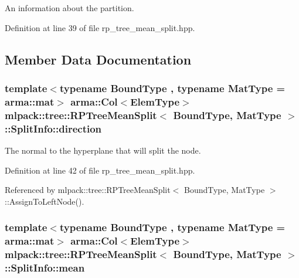 An information about the partition. 

Definition at line 39 of file rp\+\_\+tree\+\_\+mean\+\_\+split.\+hpp.



\subsection{Member Data Documentation}
\subsubsection[{direction}]{\setlength{\rightskip}{0pt plus 5cm}template$<$typename Bound\+Type , typename Mat\+Type  = arma\+::mat$>$ arma\+::\+Col$<${\bf Elem\+Type}$>$ {\bf mlpack\+::tree\+::\+R\+P\+Tree\+Mean\+Split}$<$ Bound\+Type, Mat\+Type $>$\+::Split\+Info\+::direction}\label{structmlpack_1_1tree_1_1RPTreeMeanSplit_1_1SplitInfo_af2b97d17ae339cda364a3b283a22dca6}


The normal to the hyperplane that will split the node. 



Definition at line 42 of file rp\+\_\+tree\+\_\+mean\+\_\+split.\+hpp.



Referenced by mlpack\+::tree\+::\+R\+P\+Tree\+Mean\+Split$<$ Bound\+Type, Mat\+Type $>$\+::\+Assign\+To\+Left\+Node().

\subsubsection[{mean}]{\setlength{\rightskip}{0pt plus 5cm}template$<$typename Bound\+Type , typename Mat\+Type  = arma\+::mat$>$ arma\+::\+Col$<${\bf Elem\+Type}$>$ {\bf mlpack\+::tree\+::\+R\+P\+Tree\+Mean\+Split}$<$ Bound\+Type, Mat\+Type $>$\+::Split\+Info\+::mean}\label{structmlpack_1_1tree_1_1RPTreeMeanSplit_1_1SplitInfo_a0e4c87c1eb2254001d4943b05ee858be}


